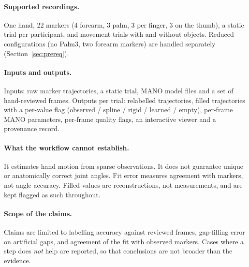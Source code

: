 \documentclass[11pt,a4paper]{article}
\begin{document}
\paragraph{Supported recordings.} One hand, 22 markers (4 forearm, 3 palm, 3 per finger, 3 on the thumb), a static
trial per participant, and movement trials with and without objects. Reduced configurations (no Palm3, two forearm
markers) are handled separately (Section~\ref{sec:prereq}).

\paragraph{Inputs and outputs.} Inputs: raw marker trajectories, a static trial, MANO model files and a set of
hand-reviewed frames. Outputs per trial: relabelled trajectories, filled trajectories with a per-value flag
(observed / spline / rigid / learned / empty), per-frame MANO parameters, per-frame quality flags, an interactive
viewer and a provenance record.

\paragraph{What the workflow cannot establish.} It estimates hand motion from sparse observations. It does not
guarantee unique or anatomically correct joint angles. Fit error measures agreement with markers, not angle accuracy.
Filled values are reconstructions, not measurements, and are kept flagged as such throughout.

\paragraph{Scope of the claims.} Claims are limited to labelling accuracy against reviewed frames, gap-filling error on
artificial gaps, and agreement of the fit with observed markers. Cases where a step does \emph{not} help are reported,
so that conclusions are not broader than the evidence.

\end{document}
